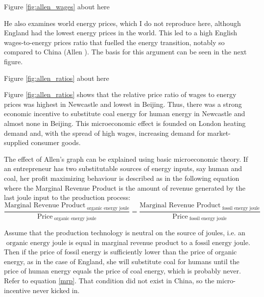 \documentclass[12pt]{article}
\numberwithin{equation}{section}
\begin{document}
\begin{center}
Figure \ref{fig:allen_wages} about here
\end{center}		
		
		He also examines world energy prices, which I do not reproduce here, although England had the lowest energy prices in the world. This led to a high English wages-to-energy prices ratio that fuelled the energy transition, notably so compared to China (Allen \citeyear[p.~140]{allen_british_2009}). The basis for this argument can be seen in the next figure. 

\begin{center}
Figure \ref{fig:allen_ratios} about here
\end{center}			
		
		
		Figure \ref{fig:allen_ratios} shows that the relative price ratio of wages to energy prices was highest in Newcastle and lowest in Beijing. Thus, there was a strong economic incentive to substitute coal energy for human energy in Newcastle and almost none in Beijing. This microeconomic effect is founded on London heating demand and, with the spread of high wages, increasing demand for market-supplied consumer goods.
		
		The effect of Allen's graph can be explained using basic microeconomic theory. If an entrepreneur has two substitutable sources of energy inputs, say human and coal, her profit maximizing behaviour is described as in the following equation where the Marginal Revenue Product is the amount of revenue generated by the last joule input to the production process:
		\begin{equation}
		\label{mrp}
		\frac{\text{Marginal Revenue Product}_{\text{ organic energy joule}}}{\text{Price}_{\text{ organic energy joule}}} = \frac{\text{Marginal Revenue Product}_{\text{ fossil energy joule}}}{\text{Price}_{\text{ fossil energy joule}}}
		\end{equation}
		
		Assume that the production technology is neutral on the source of joules, i.e. an $\text{ organic energy joule}$ is equal in marginal revenue product to a $\text{fossil energy joule}$. Then if the price of fossil energy is sufficiently lower than the price of organic energy, as in the case of England, she will substitute coal for humans until the price of human energy equals the price of coal energy, which is probably never. Refer to equation \ref{mrp}. That condition did not exist in China, so the micro-incentive never kicked in.
		
\end{document}
